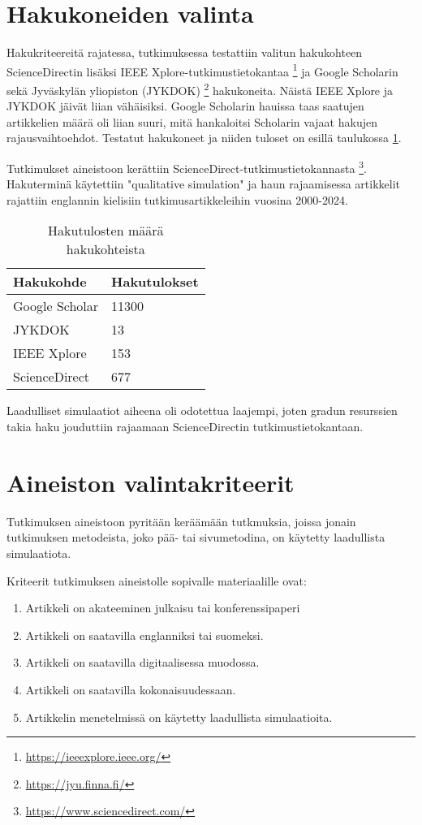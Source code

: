 \documentclass[utf8]{gradu3}
\begin{document}
\section{Hakukoneiden valinta} \label{hakukoneiden valinta}
Hakukriteereitä rajatessa, tutkimuksessa testattiin valitun hakukohteen ScienceDirectin lisäksi IEEE Xplore-tutkimustietokantaa \footnote{\url{https://ieeexplore.ieee.org/}} ja Google Scholarin sekä Jyväskylän yliopiston (JYKDOK) \footnote{\url{https://jyu.finna.fi/}} hakukoneita. Näistä IEEE Xplore ja JYKDOK jäivät liian vähäisiksi. Google Scholarin hauissa taas saatujen artikkelien määrä oli liian suuri, mitä hankaloitsi Scholarin vajaat hakujen rajausvaihtoehdot. Testatut hakukoneet ja niiden tuloset on esillä taulukossa \ref{table: hakutulokset}.

Tutkimukset aineistoon kerättiin ScienceDirect-tutkimustietokannasta \footnote{\url{https://www.sciencedirect.com/}}. Hakuterminä käytettiin "qualitative simulation" ja haun rajaamisessa artikkelit rajattiin englannin kielisiin tutkimusartikkeleihin vuosina 2000-2024. 

\begin{table}[]
\centering
\begin{tabular}{|l|l|}
\hline
\textbf{Hakukohde} & \textbf{Hakutulokset} \\ \hline
Google Scholar     & 11300                 \\ \hline
JYKDOK             & 13                    \\ \hline
IEEE Xplore        & 153                   \\ \hline
ScienceDirect      & 677                   \\ \hline
\end{tabular}
\caption{Hakutulosten määrä hakukohteista}
\label{table: hakutulokset}
\end{table}

Laadulliset simulaatiot aiheena oli odotettua laajempi, joten gradun resurssien takia haku jouduttiin rajaamaan ScienceDirectin tutkimustietokantaan.

\section{Aineiston valintakriteerit} \label{valintakriteerit}
Tutkimuksen aineistoon pyritään keräämään tutkmuksia, joissa jonain tutkimuksen metodeista, joko pää- tai sivumetodina, on käytetty laadullista simulaatiota.

Kriteerit tutkimuksen aineistolle sopivalle materiaalille ovat:
\begin{enumerate}
    \item Artikkeli on akateeminen julkaisu tai konferenssipaperi
    \item Artikkeli on saatavilla englanniksi tai suomeksi.
    \item Artikkeli on saatavilla digitaalisessa muodossa.
    \item Artikkeli on saatavilla kokonaisuudessaan.
    \item Artikkelin menetelmissä on käytetty laadullista simulaatioita.
\end{enumerate}
\end{document}
